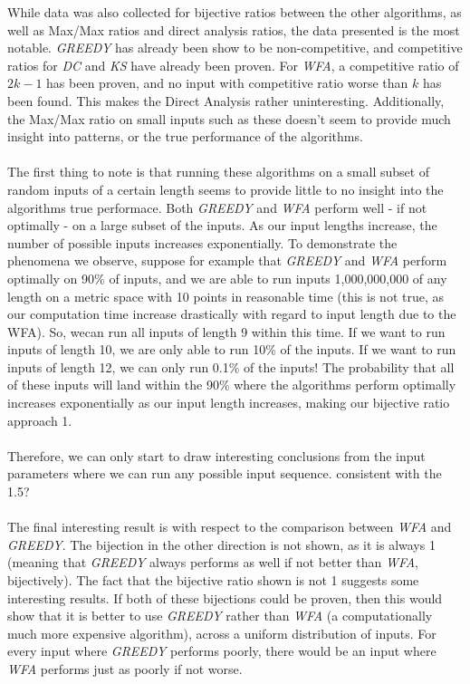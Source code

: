While data was also collected for bijective ratios between the other algorithms, as well as Max/Max ratios and direct analysis ratios, the data presented is the most notable. \textit{GREEDY} has already been show to be non-competitive, and competitive ratios for \textit{DC} and \textit{KS} have already been proven. For \textit{WFA}, a competitive ratio of $2k-1$ has been proven, and no input with competitive ratio worse than $k$ has been found. This makes the Direct Analysis rather uninteresting. Additionally, the Max/Max ratio on small inputs such as these doesn't seem to provide much insight into patterns, or the true performance of the algorithms.
\\ \\
The first thing to note is that running these algorithms on a small subset of random inputs of a certain length seems to provide little to no insight into the algorithms true performace. Both \textit{GREEDY} and \textit{WFA} perform well - if not optimally - on a large subset of the inputs. As our input lengths increase, the number of possible inputs increases exponentially. To demonstrate the phenomena we observe, suppose for example that \textit{GREEDY} and \textit{WFA} perform optimally on 90\% of inputs, and we are able to run inputs 1,000,000,000 of any length on a metric space with 10 points in reasonable time (this is not true, as our computation time increase drastically with regard to input length due to the WFA). So, wecan run all inputs of length 9 within this time. If we want to run inputs of length 10, we are only able to run 10\% of the inputs. If we want to run inputs of length 12, we can only run 0.1\% of the inputs! The probability that all of these inputs will land within the 90\% where the algorithms perform optimally increases exponentially as our input length increases, making our bijective ratio approach 1.
\\ \\
Therefore, we can only start to draw interesting conclusions from the input parameters where we can run any possible input sequence.  consistent with the 1.5?
\\ \\
The final interesting result is with respect to the comparison between \textit{WFA} and \textit{GREEDY}. The bijection in the other direction is not shown, as it is always 1 (meaning that \textit{GREEDY} always performs as well if not better than \textit{WFA}, bijectively). The fact that the bijective ratio shown is not 1 suggests some interesting results. If both of these bijections could be proven, then this would show that it is better to use \textit{GREEDY} rather than \textit{WFA} (a computationally much more expensive algorithm), across a uniform distribution of inputs. For every input where \textit{GREEDY} performs poorly, there would be an input where \textit{WFA} performs just as poorly if not worse.  